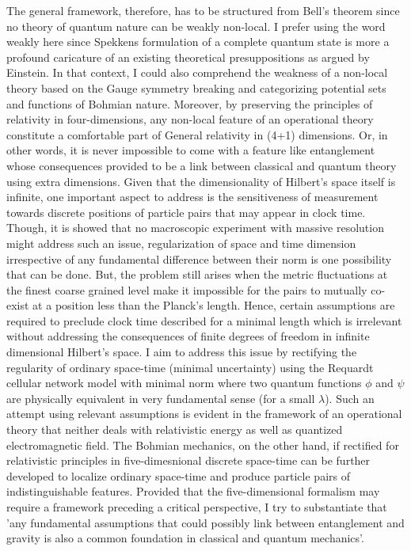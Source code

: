 \documentclass{article}
\begin{document}
The general framework, therefore, has to be structured from Bell’s theorem since no theory of quantum nature can be weakly non-local. I prefer using the word weakly here since Spekkens\cite{24} formulation of a complete quantum state is more a profound caricature of an existing theoretical presuppositions as argued by Einstein. In that context, I could also comprehend the weakness of a non-local theory based on the Gauge symmetry breaking and categorizing potential sets and functions of Bohmian nature. Moreover, by preserving the principles of relativity in four-dimensions, any non-local feature of an operational theory constitute a comfortable part of General relativity in (4+1) dimensions. Or, in other words, it is never impossible to come with a feature like entanglement whose consequences provided to be a link between classical and quantum theory using extra dimensions. Given that the dimensionality of Hilbert's space itself is infinite, one important aspect to address is the sensitiveness of measurement towards discrete positions of particle pairs that may appear in clock time. Though, it is showed \cite{23} that no macroscopic experiment with massive resolution might address such an issue, regularization of space and time dimension irrespective of any fundamental difference between their norm is one possibility that can be done. But, the problem still arises when the metric fluctuations at the finest coarse grained level make it impossible for the pairs to mutually co-exist at a position less than the Planck's length. Hence, certain assumptions are required to preclude clock time described for a minimal length which is irrelevant without addressing the consequences of finite degrees of freedom in infinite dimensional Hilbert's space. I aim to address this issue by rectifying the regularity of ordinary space-time (minimal uncertainty) using the Requardt cellular network model with minimal norm where two quantum functions $\phi$ and $\psi$ are physically equivalent in very fundamental sense (for a small $\lambda$). Such an attempt using relevant assumptions is evident in the framework of an operational theory that neither deals with relativistic energy as well as quantized electromagnetic field. The Bohmian mechanics, on the other hand, if rectified for relativistic principles in five-dimesnional discrete space-time can be further developed to localize ordinary space-time and produce particle pairs of indistinguishable features. Provided that the five-dimensional formalism may require a framework preceding a critical perspective, I try to substantiate that 'any fundamental assumptions that could possibly link between entanglement and gravity is also a common foundation in classical and quantum mechanics'.
\end{document}
